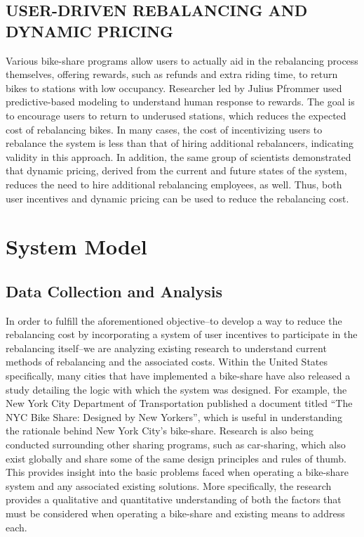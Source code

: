 \documentclass{sig-alternate}
\begin{document}
\subsection{USER-DRIVEN REBALANCING AND DYNAMIC PRICING}
Various bike-share programs allow users to actually aid in the rebalancing process themselves, offering rewards, such as refunds and extra riding time, to return bikes to stations with low occupancy. Researcher led by Julius Pfrommer used predictive-based modeling to understand human response to rewards. The goal is to encourage users to return to underused stations, which reduces the expected cost of rebalancing bikes. In many cases, the cost of incentivizing users to rebalance the system is less than that of hiring additional rebalancers, indicating validity in this approach. In addition, the same group of scientists demonstrated that dynamic pricing, derived from the current and future states of the system, reduces the need to hire additional rebalancing employees, as well. Thus, both user incentives and dynamic pricing can be used to reduce the rebalancing cost.


\section{System Model}
\label{sec:project_proposal}

\subsection{Data Collection and Analysis}
\label{subsec:approach}
In order to fulfill the aforementioned objective--to develop a way to reduce the rebalancing cost by incorporating a system of user incentives to participate in the rebalancing itself--we are analyzing existing research to understand current methods of rebalancing and the associated costs. Within the United States specifically, many cities that have implemented a bike-share have also released a study detailing the logic with which the system was designed. For example, the New York City Department of Transportation published a document titled ``The NYC Bike Share: Designed by New Yorkers'', which is useful in understanding the rationale behind New York City's bike-share. Research is also being conducted surrounding other sharing programs, such as car-sharing, which also exist globally and share some of the same design principles and rules of thumb. This provides insight into the basic problems faced when operating a bike-share system and any associated existing solutions. More specifically, the research provides a qualitative and quantitative understanding of both the factors that must be considered when operating a bike-share and existing means to address each. \newline
\end{document}
